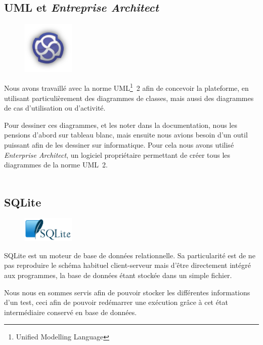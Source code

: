 \subsection{UML et \textit{Entreprise Architect}}
\begin{figure}
	\includegraphics[width=2.5cm]{contents/images/logoEnterpriseArchitect.png}
\end{figure}
Nous avons travaillé avec la norme UML\footnote{Unified Modelling Language}~2 afin de concevoir la plateforme, en utilisant particulièrement des diagrammes de classes, mais aussi des diagrammes de cas d'utilisation ou d'activité. 

Pour dessiner ces diagrammes, et les noter dans la documentation, nous les pensions d'abord sur tableau blanc, mais ensuite nous avions besoin d'un outil puissant afin de les dessiner sur informatique. Pour cela nous avons utilisé \textit{Enterprise Architect}, un logiciel propriétaire permettant de créer tous les diagrammes de la norme UML~2.\\~

\subsection{SQLite}
\begin{figure}
	\vspace{-20px}
	\includegraphics[width=2.5cm]{contents/images/sqlite.png}
\end{figure}
SQLite est un moteur de base de données relationnelle. Sa particularité est de ne pas reproduire le schéma habituel client-serveur mais d'être directement intégré aux programmes, la base de données étant stockée dans un simple fichier.

Nous nous en sommes servis afin de pouvoir stocker les différentes informations d'un test, ceci afin de pouvoir redémarrer une exécution grâce à cet état intermédiaire conservé en base de données.

